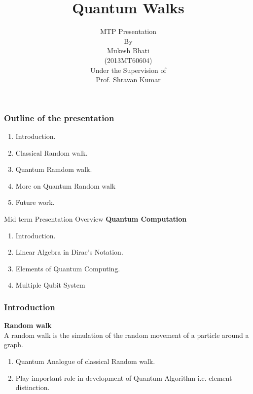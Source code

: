 \documentclass[xcolor=svgnames]{beamer}
\title{Quantum Walks}
\author[MTP Presentation]{MTP Presentation\\[0.5em]
{\scriptsize{By}}\\
[0.5em] Mukesh Bhati \\
(2013MT60604)\\
[0.5em]
{\scriptsize{Under the Supervision of }}\\
[0.5em] Prof. Shravan Kumar\\[2em]}
\institute[] {\scriptsize{Indian Institute of Technology\\  Delhi \\
[0.7em] }}
\date[January 10, 2018]{}
\begin{document}
\frame{\titlepage}



\begin{frame}
\frametitle{Outline of the presentation}
\begin{enumerate}
\item Introduction.
\item Classical Random walk.
\item Quantum Ramdom walk.
\item More on Quantum Random walk
\item Future work.
\end{enumerate}
\end{frame}


\begin{frame}{Mid term Presentation Overview}
\textbf{Quantum Computation}
\begin{enumerate}
\item Introduction.
\item Linear Algebra in Dirac's Notation.
\item Elements of Quantum Computing.
\item Multiple Qubit System
\end{enumerate}
    
\end{frame}

\begin{frame}
\frametitle{\textbf{Introduction}}
%
\textbf{Random walk}\\
A random walk is the simulation of the random movement of a particle around a graph.
\begin{itemsize}
\begin{enumerate}
    \item Quantum Analogue of classical Random walk.
    \item Play important role in development of Quantum Algorithm i.e. element distinction.
\end{enumerate}
\end{itemsize}

\end{frame}
\end{document}
